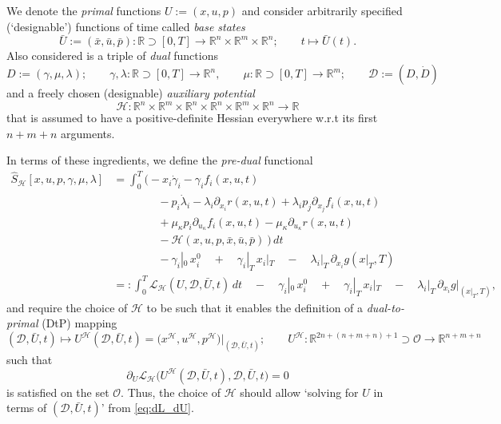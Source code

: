 \documentclass[11pt]{article}
\newcommand{\R}{\mathbb R}
\newcommand{\p}{\partial}
\newcommand{\dee}{\mathcal{D}}
\newcommand{\scl}{\mathcal{L}}
\newcommand{\sch}{\mathcal{H}}
\begin{document}
We denote the \emph{primal} functions $U := (x,u,p)$ and consider arbitrarily specified (`designable') functions of time called \emph{base states} 
\[
\bar{U} := (\bar{x},\bar{u},\bar{p}): \R \supset [0,T] \to \R^n \times \R^m \times \R^n; \qquad t \mapsto \bar{U}(t).
\]
Also considered is a triple of \emph{dual} functions
\[
D := (\gamma, \mu, \lambda); \qquad \gamma, \lambda: \R \supset [0,T] \to \R^n, \qquad \mu: \R \supset [0,T] \to \R^m; \qquad \dee := (D, \dot{D})
\]
and a freely chosen (designable) \emph{auxiliary potential}
\[
\sch: \R^n \times \R^m \times \R^n \times \R^n \times \R^m \times \R^n \to \R
\]
that is assumed to have a positive-definite Hessian everywhere w.r.t its first $n+m+n$ arguments.

In terms of these ingredients, we define the \emph{pre-dual} functional
\begin{equation}\label{eq:pre_dual}
\begin{aligned}
    \widehat{S}_\sch[x,u,p, \gamma, \mu, \lambda] & = \int_0^T \Big( - x_i \dot{\gamma}_i - \gamma_i f_i(x,u,t) \\
    & \qquad \qquad - p_i \dot{\lambda}_i - \lambda_i \p_{x_i} r(x,u,t) + \lambda_i p_j \p_{x_j} f_i (x,u,t) \\
    & \qquad \qquad + \mu_\kappa p_i \p_{u_\kappa} f_i(x,u,t) - \mu_\kappa \p_{u_\kappa} r (x,u,t)  \\
    & \qquad \qquad  - \sch(x,u,p,\bar{x}, \bar{u}, \bar{p}) \ \Big) \, dt \\
    & \qquad \qquad - \gamma_i|_0 \, x^0_i \quad + \quad \gamma_i|_T \, x_i|_T \quad - \quad \lambda_i|_T \, \p_{x_i} g(x|_T,T)  \\
    & =: \int_0^T \scl_{\sch}(U,\dee, \bar{U}, t) \,dt \quad - \quad \gamma_i|_0 \, x^0_i \quad + \quad \gamma_i|_T \, x_i|_T  \quad - \quad  \lambda_i|_T \, \p_{x_i} g\big|_{(x|_T,T)} ,
\end{aligned}
\end{equation}
and require the choice of $\sch$ to be such that it enables the definition of a \emph{dual-to-primal} (DtP) mapping
\[
(\dee, \bar{U}, t) \mapsto U^\sch(\dee, \bar{U}, t) = \Big(x^\sch, u^\sch, p^\sch \Big)\Big|_{(\dee, \bar{U}, t)}; \qquad U^\sch: \R^{2n+(n+m+n)+1} \supset \mathcal{O} \to \R^{n+m+n} 
\]
such that
\begin{equation}\label{eq:dL_dU}
    \partial_U \scl_\sch \big( U^\sch(\dee, \bar{U}, t), \dee, \bar{U}, t) = 0
\end{equation}
is satisfied on the set $\mathcal{O}$. Thus, the choice of $\sch$ should allow `solving for $U$ in terms of $(\dee, \bar{U}, t)$' from \eqref{eq:dL_dU}.
\end{document}
